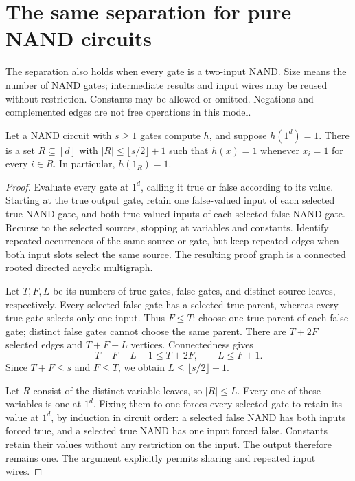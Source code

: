 \section{The same separation for pure NAND circuits}

The separation also holds when every gate is a two-input NAND. Size
means the number of NAND gates; intermediate results and input wires may
be reused without restriction. Constants may be allowed or omitted.
Negations and complemented edges are not free operations in this model.

\begin{lemma}
\label{lem:occam:nand-certificate}
Let a NAND circuit with $s\ge1$ gates compute $h$, and suppose
$h(1^d)=1$. There is a set $R\subseteq[d]$ with
$|R|\le\lfloor s/2\rfloor+1$ such that $h(x)=1$ whenever
$x_i=1$ for every $i\in R$. In particular, $h(1_R)=1$.
\end{lemma}

\begin{proof}
Evaluate every gate at $1^d$, calling it true or false according to its
value. Starting at the true output gate, retain one false-valued input
of each selected true NAND gate, and both true-valued inputs of each
selected false NAND gate. Recurse to the selected sources, stopping at
variables and constants. Identify repeated occurrences of the same
source or gate, but keep repeated edges when both input slots select
the same source. The resulting proof graph is a connected rooted
directed acyclic multigraph.

Let $T,F,L$ be its numbers of true gates, false gates, and distinct
source leaves, respectively. Every selected false gate has a selected
true parent, whereas every true gate selects only one input. Thus
$F\le T$: choose one true parent of each false gate; distinct false
gates cannot choose the same parent. There are $T+2F$ selected edges
and $T+F+L$ vertices. Connectedness gives
\[
 T+F+L-1\le T+2F,\qquad L\le F+1.
\]
Since $T+F\le s$ and $F\le T$, we obtain
$L\le\lfloor s/2\rfloor+1$.

Let $R$ consist of the distinct variable leaves, so $|R|\le L$.
Every one of these variables is one at $1^d$. Fixing them to one
forces every selected gate to retain its value at $1^d$, by induction
in circuit order: a selected false NAND has both inputs forced true,
and a selected true NAND has one input forced false. Constants retain
their values without any restriction on the input. The output
therefore remains one. The argument explicitly permits sharing and
repeated input wires.
\end{proof}


